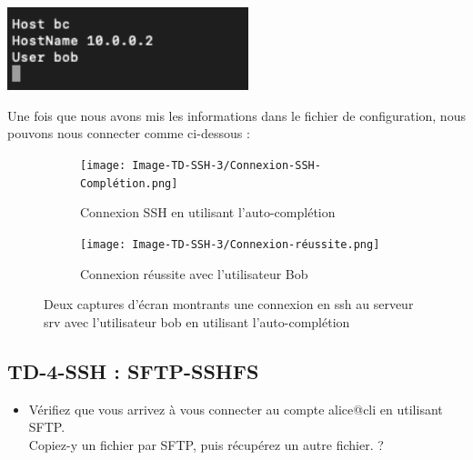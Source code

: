 \documentclass[12pt]{article}
\begin{document}
\vspace{0.3cm}

\begin{center}
  \includegraphics[width=7cm]{Image-TD-SSH-3/ligne-conf.png}
\end{center}

\vspace{0.3cm}

\newpage

Une fois que nous avons mis les informations dans le fichier de configuration, nous pouvons nous connecter comme ci-dessous : 

\vspace{0.3cm}

\begin{figure}[h]
  \centering
  \begin{subfigure}{0.30\textwidth}
    \centering
    \texttt{[image: Image-TD-SSH-3/Connexion-SSH-Complétion.png]}
    \caption{Connexion SSH en utilisant l'auto-complétion}
  \end{subfigure}
  \vspace{0.9cm} %
  \begin{subfigure}{0.45\textwidth}
    \centering
    \texttt{[image: Image-TD-SSH-3/Connexion-réussite.png]}
    \caption{Connexion réussite avec l'utilisateur Bob}
  \end{subfigure}
  \caption{Deux captures d'écran montrants une connexion en ssh au serveur srv avec l'utilisateur bob en utilisant l'auto-complétion}
\end{figure}

\vspace{0.3cm}

\subsection{TD-4-SSH : SFTP-SSHFS}

\begin{itemize}
  \item Vérifiez que vous arrivez à vous connecter au compte alice@cli en utilisant SFTP. \\ 
  Copiez-y un fichier par SFTP, puis récupérez un autre fichier. ?
\end{itemize}
\end{document}
